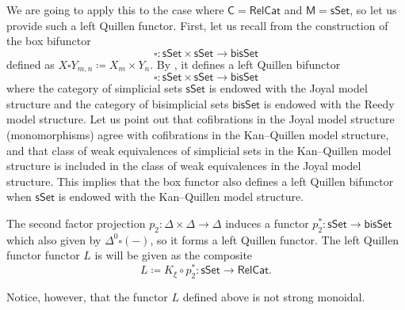 \documentclass[a4paper,12pt]{amsart}
\theoremstyle{plain}
\theoremstyle{definition}
\theoremstyle{remark}
\begin{document}
We are going to apply this to the case where $\mathsf{C}= \mathsf{RelCat}$ and $\mathsf{M}=\mathsf{sSet}$, so let us provide such a left Quillen functor. First, let us recall from \cite{JoaylTierney07} the construction of the box bifunctor 
\[
\square: \mathsf{sSet} \times \mathsf{sSet} \longrightarrow \mathsf{bisSet}
\]
defined as $X \square Y_{m,n} \coloneqq X_m\times Y_n$. By \cite[Proposition 4.6]{JoaylTierney07}, it defines a left Quillen bifunctor
\[
\square :  \mathsf{sSet} \times  \mathsf{sSet} \rightarrow \mathsf{bisSet}
\]
where the category of simplicial sets $\mathsf{sSet}$ is endowed with the Joyal model structure and the category of bisimplicial sets $\mathsf{bisSet}$ is endowed with the Reedy model structure. Let us 
point out that cofibrations in the Joyal model structure (monomorphisms) agree with cofibrations in the Kan--Quillen model structure, and that class of weak equivalences of simplicial sets in the Kan--Quillen model structure is included in the class of weak equivalences in the Joyal model structure. This implies that the box functor also defines a left Quillen bifunctor when $\mathsf{sSet}$ is endowed with the Kan--Quillen model structure. 


The second factor projection $p_2:\Delta\times\Delta \longrightarrow\Delta$ induces a functor $p_2^*:\mathsf{sSet} \rightarrow \mathsf{bisSet}$ which also given by $\Delta^0 \square (-)$, so it forms a left Quillen functor. The left Quillen functor functor $L$ is will be given as the composite
\[
L \coloneqq K_{\xi} \circ p_2^*: \mathsf{sSet}\rightarrow \mathsf{RelCat}.
\]

Notice, however, that the functor $L$ defined above is not strong monoidal. 
\end{document}
